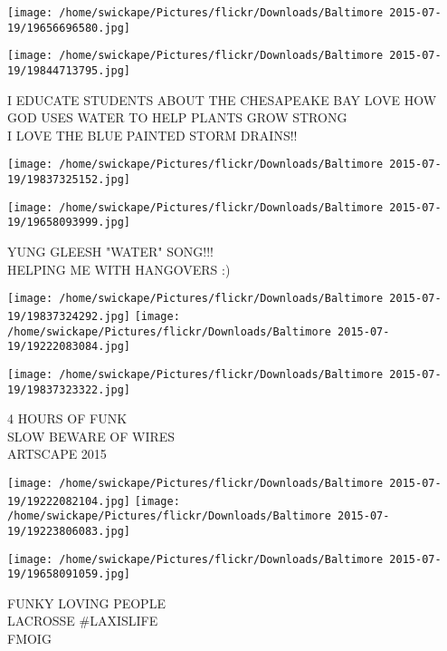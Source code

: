 \documentclass[10pt,letterpaper]{article}
\begin{document}
\texttt{[image: /home/swickape/Pictures/flickr/Downloads/Baltimore 2015-07-19/19656696580.jpg]}

\vspace{0.25in}
\texttt{[image: /home/swickape/Pictures/flickr/Downloads/Baltimore 2015-07-19/19844713795.jpg]}

I EDUCATE STUDENTS ABOUT THE CHESAPEAKE BAY LOVE HOW GOD USES WATER TO HELP PLANTS GROW STRONG\\
I LOVE THE BLUE PAINTED STORM DRAINS!!\\
\pagebreak

\texttt{[image: /home/swickape/Pictures/flickr/Downloads/Baltimore 2015-07-19/19837325152.jpg]}

\vspace{0.25in}
\texttt{[image: /home/swickape/Pictures/flickr/Downloads/Baltimore 2015-07-19/19658093999.jpg]}

YUNG GLEESH "WATER" SONG!!!\\
HELPING ME WITH HANGOVERS :)\\
\pagebreak

\texttt{[image: /home/swickape/Pictures/flickr/Downloads/Baltimore 2015-07-19/19837324292.jpg]}
\texttt{[image: /home/swickape/Pictures/flickr/Downloads/Baltimore 2015-07-19/19222083084.jpg]}

\vspace{0.25in}
\texttt{[image: /home/swickape/Pictures/flickr/Downloads/Baltimore 2015-07-19/19837323322.jpg]}

4 HOURS OF FUNK\\
SLOW BEWARE OF WIRES\\
ARTSCAPE 2015\\
\pagebreak

\texttt{[image: /home/swickape/Pictures/flickr/Downloads/Baltimore 2015-07-19/19222082104.jpg]}
\texttt{[image: /home/swickape/Pictures/flickr/Downloads/Baltimore 2015-07-19/19223806083.jpg]}

\vspace{0.25in}
\texttt{[image: /home/swickape/Pictures/flickr/Downloads/Baltimore 2015-07-19/19658091059.jpg]}

FUNKY LOVING PEOPLE\\
LACROSSE \#LAXISLIFE\\
FMOIG\\
\pagebreak
\end{document}
